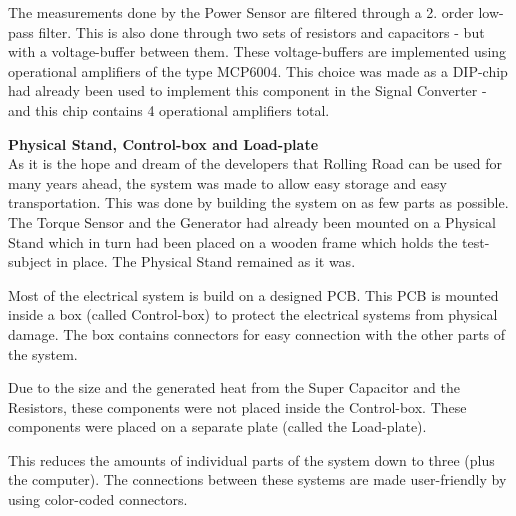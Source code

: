 The measurements done by the Power Sensor are filtered through a 2. order low-pass filter. This is also done through two sets of resistors and capacitors - but with a voltage-buffer between them. These voltage-buffers are implemented using operational amplifiers of the type MCP6004\cite{MCP6004}. This choice was made as a DIP-chip had already been used to implement this component in the Signal Converter - and this chip contains 4 operational amplifiers total.

\textbf{Physical Stand, Control-box and Load-plate}\\
As it is the hope and dream of the developers that Rolling Road can be used for many years ahead, the system was made to allow easy storage and easy transportation. This was done by building the system on as few parts as possible. The Torque Sensor and the Generator had already been mounted on a Physical Stand which in turn had been placed on a wooden frame which holds the test-subject in place. The Physical Stand remained as it was.

Most of the electrical system is build on a designed PCB. This PCB is mounted inside a box (called Control-box) to protect the electrical systems from physical damage. The box contains connectors for easy connection with the other parts of the system.

Due to the size and the generated heat from the Super Capacitor and the Resistors, these components were not placed inside the Control-box. These components were placed on a separate plate (called the Load-plate).

This reduces the amounts of individual parts of the system down to three (plus the computer). The connections between these systems are made user-friendly by using color-coded connectors.